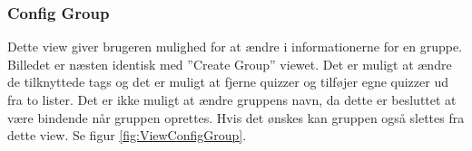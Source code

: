 \subsubsection{Config Group}
Dette view giver brugeren mulighed for at ændre i informationerne for en gruppe. Billedet er næsten identisk med ''Create Group'' viewet. Det er muligt at ændre de tilknyttede tags og det er muligt at fjerne quizzer og tilføjer egne quizzer ud fra to lister. Det er ikke muligt at ændre gruppens navn, da dette er besluttet at være bindende når gruppen oprettes. Hvis det ønskes kan gruppen også slettes fra dette view. Se figur \ref{fig:ViewConfigGroup}. 

